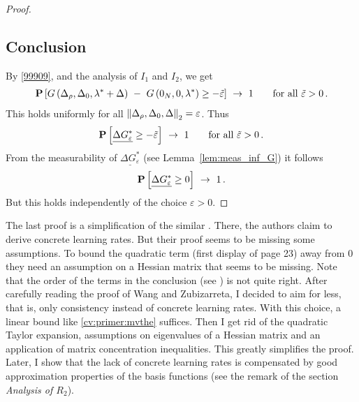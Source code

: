 \begin{proof}
\subsection*{Conclusion}
By \eqref{99909}, and the analysis of $I_1$ and $I_2$, we get
\begin{align*}
  \P
  \left[ 
   G
   \left( 
\Delta_\rho,\Delta_0,\lambda^*+\Delta
   \right)
   \ 
   -
   \ 
   G
   \left(
0_N,0,\lambda^*
   \right)
   \ge - 
  \tilde{\varepsilon}
  \right]
  \ 
  \to
  \ 
  1
  \qquad
  \text{for all}\ 
  \tilde{\varepsilon}>0
  \,.
\end{align*}
This holds uniformly for all 
$
\left\lVert
\Delta_\rho,\Delta_0,\Delta
\right\rVert_2=\varepsilon
$.
Thus
\begin{align*}
  \P
  \left[ 
  \underline{\Delta G^*_\varepsilon}
   \ge - 
  \tilde{\varepsilon}
  \right]
  \ 
  \to
  \ 
  1
  \qquad
  \text{for all}\ 
  \tilde{\varepsilon}>0
  \,.
\end{align*}
From the measurability of 
$
  \underline{\Delta G^*_\varepsilon}
$ 
(see Lemma~\ref{lem:meas_inf_G})
it follows
\begin{align*}
  \P
  \left[ 
  \underline{\Delta G^*_\varepsilon}
   \ge 0
  \right]
  \ 
  \to
  \ 
  1
  \,.
\end{align*}
But this holds independently of the choice $\varepsilon>0$.
 \end{proof}
\begin{remark}
  The last proof is a simplification of the similar \cite[Proof of Lemma~2]{Wang2019}. There, the authors claim to derive concrete learning rates. 
  But their proof seems to be missing some assumptions. To bound the quadratic term (first display of page 23) away from 0 they need an assumption on a Hessian matrix that seems to be missing.
  Note that the order of the terms in the conclusion (see \cite[page 25]{Wang2019}) is not quite right.
  After carefully reading the proof of Wang and Zubizarreta, I decided to aim for less, that is, only consistency instead of concrete learning rates.
  With this choice, a linear bound like \eqref{cv:primer:mvthe} suffices. Then I get rid of the quadratic Taylor expansion, assumptions on eigenvalues of a Hessian matrix and an application of matrix concentration inequalities. This greatly simplifies the proof.
  Later, I show that the lack of concrete learning rates is compensated by good approximation properties of the basis functions (see the remark of the section \textit{Analysis of $R_2$}).
\end{remark}
